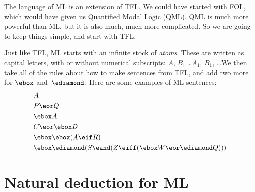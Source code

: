 The language of ML is an extension of TFL. We could have started with FOL, which would have given us Quantified Modal Logic (QML). QML is much more powerful than ML, but it is also much, much more complicated. So we are going to keep things simple, and start with TFL.

Just like TFL, ML starts with an infinite stock of \emph{atoms}. These are written as capital letters, with or without numerical subscripts: $A$, $B$, \dots  $A_1$, $B_1$, \dots  We then take all of the rules about how to make sentences from TFL, and add two more for $\ebox$ and~$\ediamond$:
Here are some examples of ML sentences:
\begin{align*}
	& A\\
	& P\eor Q\\
	& \ebox A\\
	& C\eor \ebox D\\
	& \ebox\ebox (A\eif R)\\
	& \ebox\ediamond (S\eand (Z\eiff (\ebox W \eor \ediamond Q)))
\end{align*}

\chapter{Natural deduction for ML}
\label{Proof}

